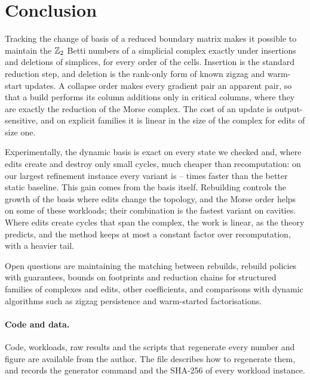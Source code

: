 \section{Conclusion}\label{sec:conclusion}

Tracking the change of basis of a reduced boundary matrix makes it possible to
maintain the $\mathbb{Z}_2$ Betti numbers of a simplicial complex exactly under insertions
and deletions of simplices, for every order of the cells. Insertion is the
standard reduction step, and deletion is the rank-only form of known zigzag and
warm-start updates. A collapse order makes every gradient pair an apparent pair,
so that a build performs its column additions only in critical columns, where
they are exactly the reduction of the Morse complex. The cost of an update is
output-sensitive, and on explicit families it is linear in the size of the
complex for edits of size one.

Experimentally, the dynamic basis is exact on every state we checked and, where
edits create and destroy only small cycles, much cheaper than recomputation:
on our largest refinement instance every variant is
\NumMainWTwoLargestSpeedupMin--\NumMainWTwoLargestSpeedupMax{} times faster than
the better static baseline. This gain comes from the basis itself. Rebuilding
controls the growth of the basis where edits change the topology, and the Morse
order helps on some of these workloads; their combination is the fastest variant
on cavities. Where edits create cycles that span the complex, the work is
linear, as the theory predicts, and the method keeps at most a constant factor
over recomputation, with a heavier tail.

Open questions are maintaining the matching between rebuilds, rebuild policies
with guarantees, bounds on footprints and reduction chains for structured
families of complexes and edits, other coefficients, and comparisons with
dynamic algorithms such as zigzag persistence and warm-started factorisations.

\paragraph{Code and data.} Code, workloads, raw results and the scripts that
regenerate every number and figure are available from the author.
The file  describes how to regenerate them, and
 records the generator command
and the SHA-256 of every workload instance.
